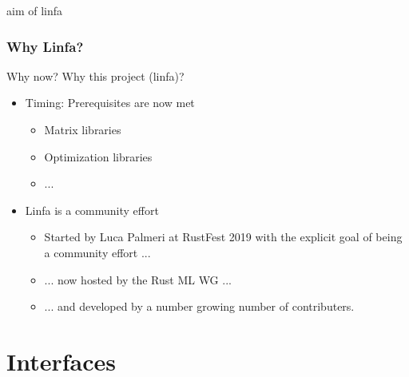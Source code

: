 \documentclass[xcolor=x11names,compress]{beamer}
\begin{document}
\begin{frame}{aim of linfa}
    \frametitle{Why Linfa?}
    Why now? Why this project (linfa)?
    \begin{itemize}
        \item<2-> Timing: Prerequisites are now met
        \begin{itemize}[label=-]
            \item<3->{Matrix libraries}
	    \item<4->{Optimization libraries}
	    \item<5->{...}
        \end{itemize}
	    \item<6-> Linfa is a community effort
        \begin{itemize}[label=-]
            \item<7->{Started by Luca Palmeri at RustFest 2019 with the explicit goal of being a community effort ...}
	    \item<8->{... now hosted by the Rust ML WG ... }
	    \item<9->{... and developed by a number growing number of contributers.}
        \end{itemize}	
    \end{itemize}
\end{frame}

\section{Interfaces}
\end{document}
